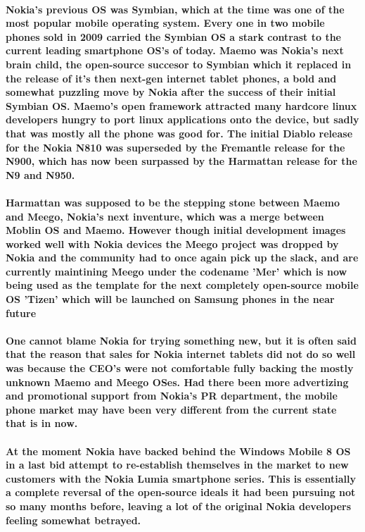 \paragraph{Nokia's previous OS was Symbian, which at the time was one of the most popular mobile operating system. Every one in two mobile phones sold in 2009 carried the Symbian OS\cite{symb1} a stark contrast to the current leading smartphone OS's of today. Maemo was Nokia's next brain child, the open-source succesor to Symbian which it replaced in the release of  it's then next-gen internet tablet phones, a bold and somewhat puzzling move by Nokia after the success of their initial Symbian OS. Maemo's open framework attracted many hardcore linux developers hungry to port linux applications onto the device, but sadly that was mostly all the phone was good for. The initial Diablo release for the Nokia N810 was superseded by  the Fremantle release for the N900, which has now been surpassed by the Harmattan release for the N9 and N950.}
\paragraph{Harmattan was supposed to be the stepping stone between Maemo and Meego, Nokia's next inventure, which was a merge between Moblin OS and Maemo. However though initial development images worked well with Nokia devices the Meego project was dropped by Nokia and the community had to once again pick up the slack, and are currently maintining Meego under the codename 'Mer' which is now being used as the template for the next completely open-source mobile OS 'Tizen' which will be launched on Samsung phones in the near future}
\paragraph{One cannot blame Nokia for trying something new, but it is often said that the reason that sales for Nokia internet tablets did not do so well was because the CEO's were not comfortable fully backing the mostly unknown Maemo and Meego OSes. Had there been more advertizing and promotional support from Nokia's PR department, the mobile phone market may have been very different from the current state that is in now.}
\paragraph{At the moment Nokia have backed behind the Windows Mobile 8 OS in a last bid attempt to re-establish themselves in the market to new customers with the Nokia Lumia smartphone series. This is essentially a complete reversal of the open-source ideals it had been pursuing not so many months before, leaving a lot of the original Nokia developers feeling somewhat betrayed.}

